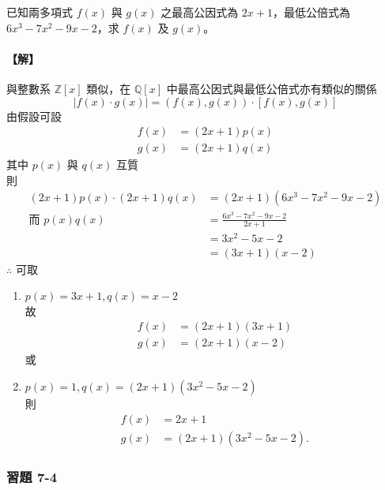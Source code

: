 \begin{example}\label{ex:7-2-6}
已知兩多項式 $f(x)$ 與 $g(x)$ 之最高公因式為 $2x+1$，最低公倍式為 $6x^3-7x^2-9x-2$，求 $f(x)$ 及 $g(x)$。

\paragraph{【解】}
與整數系 $\mathbb{Z}[x]$ 類似，在 $\mathbb{Q}[x]$ 中最高公因式與最低公倍式亦有類似的關係
\begin{equation*}
  |f(x) \cdot g(x)| = (f(x), g(x)) \cdot [f(x), g(x)]
\end{equation*}
由假設可設
\begin{align*}
  f(x) &= (2x+1)p(x) \\
  g(x) &= (2x+1)q(x)
\end{align*}
其中 $p(x)$ 與 $q(x)$ 互質\\
則
\begin{align*}
  (2x+1)p(x) \cdot (2x+1)q(x) &= (2x+1)(6x^3-7x^2-9x-2) \\
  \text{而 } p(x)q(x) &= \frac{6x^3-7x^2-9x-2}{2x+1} \\
  &= 3x^2-5x-2 \\
  &= (3x+1)(x-2)
\end{align*}
$\therefore$ 可取
\begin{enumerate}[(1)]
  \item $p(x) = 3x+1, q(x) = x-2$\\
  故
  \begin{align*}
    f(x) &= (2x+1)(3x+1) \\
    g(x) &= (2x+1)(x-2)
  \end{align*}
  或
  \item $p(x) = 1, q(x) = (2x+1)(3x^2-5x-2)$\\
  則
  \begin{align*}
    f(x) &= 2x+1 \\
    g(x) &= (2x+1)(3x^2-5x-2).
  \end{align*}
\end{enumerate}
\end{example}

\subsubsection*{習題 7-4}\label{sec:ex7-4}

